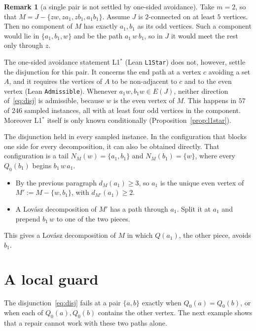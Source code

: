 \documentclass[11pt]{amsart}
\theoremstyle{definition}
\newtheorem{remark}[theorem]{Remark}
\begin{document}
\begin{remark}[a single pair is not settled by one-sided avoidance]\label{rem:onepair}
Take $m=2$, so that $M=J-\{zw,za_1,zb_1,a_1b_1\}$. Assume $J$ is $2$-connected on at least $5$ vertices.
Then no component of $M$ has exactly $a_1,b_1$ as its odd vertices. Such a component would lie
in $\{a_1,b_1,w\}$ and be the path $a_1\,w\,b_1$, so in $J$ it would meet the rest only through $z$.

The one-sided avoidance statement L1$^*$ (Lean \texttt{L1Star}) does not, however, settle the
disjunction for this pair. It concerns the end path at a vertex $c$ avoiding a set $A$, and it requires
the vertices of $A$ to be non-adjacent to $c$ and to the even vertex (Lean \texttt{Admissible}).
Whenever $a_1w,b_1w\in E(J)$, neither direction of~\eqref{eq:disj} is admissible, because $w$ is the
even vertex of $M$. This happens in $57$ of $246$ sampled instances, all with at least four odd
vertices in the component. Moreover L1$^*$ itself is only known conditionally (Proposition~\ref{prop:l1star}).

The disjunction held in every sampled instance. In the configuration that blocks one side for
every decomposition, it can also be obtained directly. That configuration is a tail
$N_M(w)=\{a_1,b_1\}$ and $N_M(b_1)=\{w\}$, where every $Q_0(b_1)$ begins $b_1\,w\,a_1$.
\begin{itemize}[leftmargin=*]
\item By the previous paragraph $d_M(a_1)\ge 3$, so $a_1$ is the unique even vertex of
$M':=M-\{w,b_1\}$, with $d_{M'}(a_1)\ge 2$.
\item A Lov\'asz decomposition of $M'$ has a path through $a_1$. Split it at $a_1$ and prepend $b_1\,w$
to one of the two pieces.
\end{itemize}
This gives a Lov\'asz decomposition of $M$ in which $Q(a_1)$, the other piece, avoids $b_1$.
\end{remark}

\section{A local guard}

The disjunction~\eqref{eq:disj} fails at a pair $\{a,b\}$ exactly when $Q_0(a)=Q_0(b)$, or when each of
$Q_0(a),Q_0(b)$ contains the other vertex. The next example shows that a repair cannot work with these
two paths alone.
\end{document}
